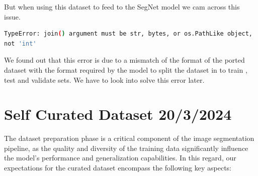 But when using this dataset to feed to the SegNet model we cam across this issue.

\begin{lstlisting}[language=bash]
TypeError: join() argument must be str, bytes, or os.PathLike object, 
not 'int'
\end{lstlisting}

We found out that this error is due to a mismatch of the format of the ported dataset with the format required by the model to split the dataset in to train , test and validate sets. We have to look into solve this error later.

\section{Self Curated Dataset 20/3/2024}
The dataset preparation phase is a critical component of the image segmentation pipeline, as the quality and diversity of the training data significantly influence the model's performance and generalization capabilities. In this regard, our expectations for the curated dataset encompass the following key aspects:

